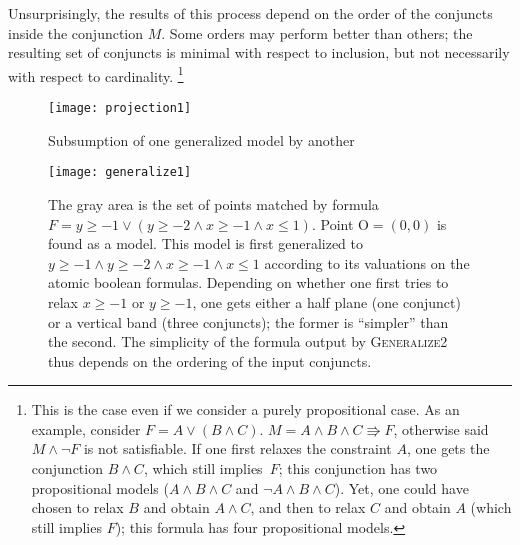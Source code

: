 Unsurprisingly, the results of this process depend on the order of the conjuncts inside the conjunction $M$. Some orders may perform better than others; the resulting set of conjuncts is minimal with respect to inclusion, but not necessarily with respect to cardinality.
\footnote{This is the case even if we consider a purely propositional case. As an example, consider $F = A \vee (B \wedge C)$. $M = A \wedge B \wedge C \Rrightarrow F$, otherwise said $M \wedge \neg F$ is not satisfiable. If one first relaxes the constraint $A$, one gets the conjunction $B \wedge C$, which still implies~$F$; this conjunction has two propositional models ($A \wedge B \wedge C$ and $\neg A \wedge B \wedge C$). Yet, one could have chosen to relax $B$ and obtain $A \wedge C$, and then to relax $C$ and obtain $A$ (which still implies $F$); this formula has four propositional models.}

\begin{figure}
\begin{center}
\texttt{[image: projection1]}
\end{center}
\caption{Subsumption of one generalized model by another}
\label{fig:projection1}
\end{figure}

\begin{figure}
\begin{center}
\texttt{[image: generalize1]}
\end{center}
\caption{The gray area is the set of points matched by formula $F = y \geq -1 \vee (y \geq -2 \wedge x \geq -1 \wedge x \leq 1)$. Point $\mathrm{O}=(0,0)$ is found as a model. This model is first generalized to $y \geq -1 \wedge y \geq -2 \wedge x \geq -1 \wedge x \leq 1$ according to its valuations on the atomic boolean formulas. Depending on whether one first tries to relax $x \geq -1$ or $y \geq -1$, one gets either a half plane (one conjunct) or a vertical band (three conjuncts); the former is ``simpler'' than the second. The simplicity of the formula output by \textsc{Generalize2} thus depends on the ordering of the input conjuncts.}
\label{fig:generalize1}
\end{figure}

